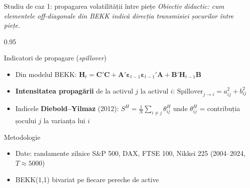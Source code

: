 \documentclass[9pt, aspectratio=169, t]{beamer}
\begin{document}
\begin{frame}{Studiu de caz 1: propagarea volatilității între piețe}
    \vspace{-2mm}
    {\scriptsize\textit{Obiectiv didactic: cum elementele off-diagonale din BEKK indică direcția transmisiei șocurilor între piețe.}}\vspace{1mm}
    \begin{cminipage}{0.95\textwidth}
    {\scriptsize
    \begin{block}{Indicatori de propagare (\textit{spillover})}
        \begin{itemize}\setlength{\itemsep}{0pt}
            \item Din modelul BEKK: $\mathbf{H}_t = \mathbf{C}'\mathbf{C} + \mathbf{A}'\boldsymbol{\varepsilon}_{t-1}\boldsymbol{\varepsilon}_{t-1}'\mathbf{A} + \mathbf{B}'\mathbf{H}_{t-1}\mathbf{B}$
            \item \textbf{Intensitatea propagării} de la activul $j$ la activul $i$: $\text{Spillover}_{j \rightarrow i} = a_{ij}^2 + b_{ij}^2$
            \item Indicele \textbf{Diebold--Yilmaz} (2012): $S^H = \frac{1}{N}\sum_{i \neq j} \theta_{ij}^H$ unde $\theta_{ij}^H$ = contribuția șocului $j$ la varianța lui $i$
        \end{itemize}
    \end{block}
    \begin{alertblock}{Metodologie}
        \begin{itemize}\setlength{\itemsep}{0pt}
            \item Date: randamente zilnice S\&P 500, DAX, FTSE 100, Nikkei 225 (2004--2024, $T \approx 5000$)
            \item BEKK(1,1) bivariat pe fiecare pereche de active
        \end{itemize}
    \end{alertblock}
    }
    \end{cminipage}
\end{frame}
\end{document}

